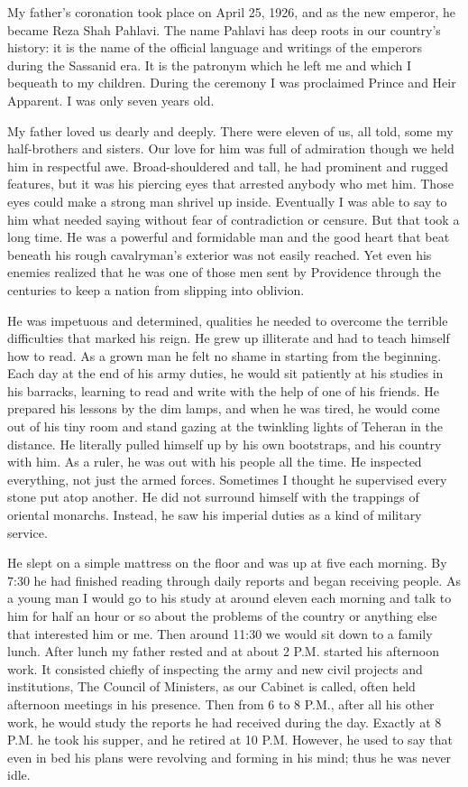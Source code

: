 My father's coronation took place on April 25, 1926, and as the new emperor, he became Reza Shah Pahlavi. The name Pahlavi has deep roots in our country’s history: it is the name of the official language and writings of the emperors during the Sassanid era. It is the patronym which he left me and which I bequeath to my children. During the ceremony I was proclaimed Prince and Heir Apparent. I was only seven years old. 

My father loved us dearly and deeply. There were eleven of us, all told, some my half-brothers and sisters. Our love for him was full of admiration though we held him in respectful awe. Broad-shouldered and tall, he had prominent and rugged features, but it was his piercing eyes that arrested anybody who met him. Those eyes could make a strong man shrivel up inside. Eventually I was able to say to him what needed saying without fear of contradiction or censure. But that took a long time. He was a powerful and formidable man and the good heart that beat beneath his rough cavalryman's exterior was not easily reached. Yet even his enemies realized that he was one of those men sent by Providence through the centuries to keep a nation from slipping into oblivion. 

He was impetuous and determined, qualities he needed to overcome the terrible difficulties that marked his reign. He grew up illiterate and had to teach himself how to read. As a grown man he felt no shame in starting from the beginning. Each day at the end of his army duties, he would sit patiently at his studies in his barracks, learning to read and write with the help of one of his friends. He prepared his lessons by the dim lamps, and when he was tired, he would come out of his tiny room and stand gazing at the twinkling lights of Teheran in the distance. He literally pulled himself up by his own bootstraps, and his country with him. As a ruler, he was out with his people all the time. He inspected everything, not just the armed forces. Sometimes I thought he supervised every stone put atop another. He did not surround himself with the trappings of oriental monarchs. Instead, he saw his imperial duties as a kind of military service. 

He slept on a simple mattress on the floor and was up at five each morning. By 7:30 he had finished reading through daily reports and began receiving people. As a young man I would go to his study at around eleven each morning and talk to him for half an hour or so about the problems of the country or anything else that interested him or me. Then around 11:30 we would sit down to a family lunch. After lunch my father rested and at about 2 P.M. started his afternoon work. It consisted chiefly of inspecting the army and new civil projects and institutions, The Council of Ministers, as our Cabinet is called, often held afternoon meetings in his presence. Then from 6 to 8 P.M., after all his other work, he would study the reports he had received during the day. Exactly at 8 P.M. he took his supper, and he retired at 10 P.M. However, he used to say that even in bed his plans were revolving and forming in his mind; thus he was never idle. 

